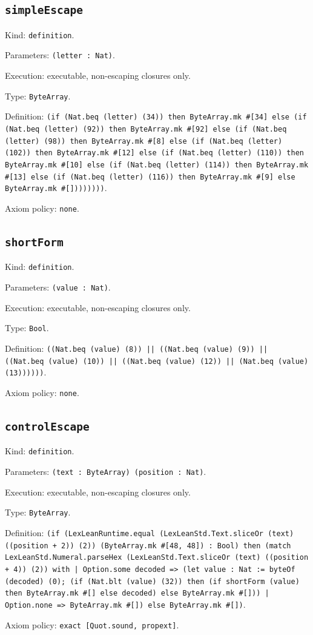 \documentclass[11pt]{article}
\begin{document}
\subsection*{\texttt{simpleEscape}}
\noindent Kind: \texttt{definition}.\par
\noindent Parameters: \texttt{(letter : Nat)}.\par
\noindent Execution: executable, non-escaping closures only.\par
\noindent Type: \texttt{ByteArray}.\par
\noindent Definition: \texttt{(if (Nat.beq (letter) (34)) then ByteArray.mk \#[34] else (if (Nat.beq (letter) (92)) then ByteArray.mk \#[92] else (if (Nat.beq (letter) (98)) then ByteArray.mk \#[8] else (if (Nat.beq (letter) (102)) then ByteArray.mk \#[12] else (if (Nat.beq (letter) (110)) then ByteArray.mk \#[10] else (if (Nat.beq (letter) (114)) then ByteArray.mk \#[13] else (if (Nat.beq (letter) (116)) then ByteArray.mk \#[9] else ByteArray.mk \#[])))))))}.\par
\noindent Axiom policy: \texttt{none}.\par
\subsection*{\texttt{shortForm}}
\noindent Kind: \texttt{definition}.\par
\noindent Parameters: \texttt{(value : Nat)}.\par
\noindent Execution: executable, non-escaping closures only.\par
\noindent Type: \texttt{Bool}.\par
\noindent Definition: \texttt{((Nat.beq (value) (8)) || ((Nat.beq (value) (9)) || ((Nat.beq (value) (10)) || ((Nat.beq (value) (12)) || (Nat.beq (value) (13))))))}.\par
\noindent Axiom policy: \texttt{none}.\par
\subsection*{\texttt{controlEscape}}
\noindent Kind: \texttt{definition}.\par
\noindent Parameters: \texttt{(text : ByteArray) (position : Nat)}.\par
\noindent Execution: executable, non-escaping closures only.\par
\noindent Type: \texttt{ByteArray}.\par
\noindent Definition: \texttt{(if (LexLeanRuntime.equal (LexLeanStd.Text.sliceOr (text) ((position + 2)) (2)) (ByteArray.mk \#[48, 48]) : Bool) then (match LexLeanStd.Numeral.parseHex (LexLeanStd.Text.sliceOr (text) ((position + 4)) (2)) with | Option.some decoded => (let value : Nat := byteOf (decoded) (0); (if (Nat.blt (value) (32)) then (if shortForm (value) then ByteArray.mk \#[] else decoded) else ByteArray.mk \#[])) | Option.none => ByteArray.mk \#[]) else ByteArray.mk \#[])}.\par
\noindent Axiom policy: \texttt{exact [Quot.sound, propext]}.\par
\end{document}
